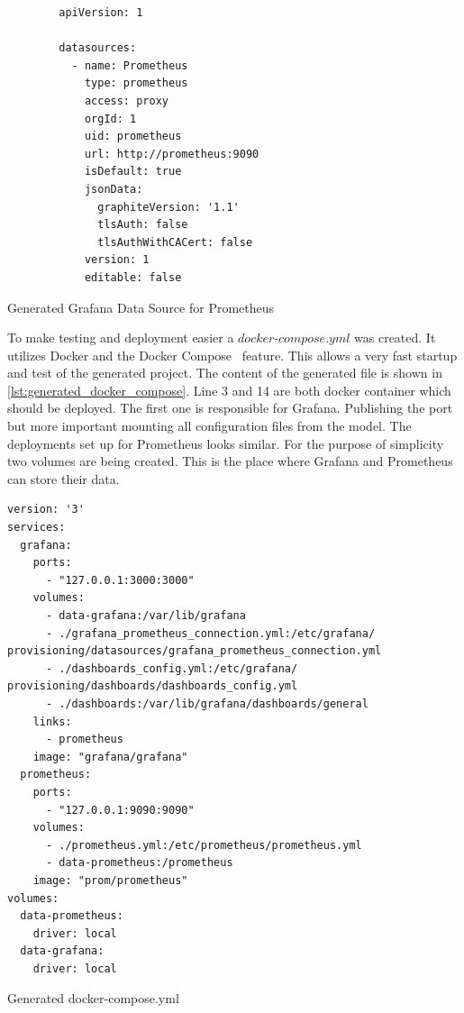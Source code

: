 \begin{listing}[!ht]
	\begin{verbatim}
        apiVersion: 1
        
        datasources:
          - name: Prometheus
            type: prometheus
            access: proxy
            orgId: 1
            uid: prometheus
            url: http://prometheus:9090
            isDefault: true
            jsonData:
              graphiteVersion: '1.1'
              tlsAuth: false
              tlsAuthWithCACert: false
            version: 1
            editable: false
	\end{verbatim}
	\caption{Generated Grafana Data Source for Prometheus}
	\label{lst:generated_data_source}
\end{listing}

To make testing and deployment easier a $docker\text{-}compose.yml$ was created. It utilizes Docker and the Docker Compose~\cite{poulton2019docker} feature.  This allows a very fast startup and test of the generated project. The content of the generated file is shown in \cref{lst:generated_docker_compose}. Line 3 and 14 are both docker container which should be deployed. The first one is responsible for Grafana. Publishing the port but more important mounting all configuration files from the model. The deployments set up for Prometheus looks similar. For the purpose of simplicity two volumes are being created. This is the place where Grafana and Prometheus can store their data.

\begin{listing}[!ht]
	\begin{verbatim}
version: '3'
services:
  grafana:
    ports:
      - "127.0.0.1:3000:3000"
    volumes:
      - data-grafana:/var/lib/grafana
      - ./grafana_prometheus_connection.yml:/etc/grafana/ provisioning/datasources/grafana_prometheus_connection.yml
      - ./dashboards_config.yml:/etc/grafana/ provisioning/dashboards/dashboards_config.yml
      - ./dashboards:/var/lib/grafana/dashboards/general
    links:
      - prometheus
    image: "grafana/grafana"
  prometheus:
    ports:
      - "127.0.0.1:9090:9090"
    volumes:
      - ./prometheus.yml:/etc/prometheus/prometheus.yml
      - data-prometheus:/prometheus
    image: "prom/prometheus"
volumes:
  data-prometheus:
    driver: local
  data-grafana:
    driver: local
	\end{verbatim}
	\caption{Generated docker-compose.yml}
	\label{lst:generated_docker_compose}
\end{listing}


